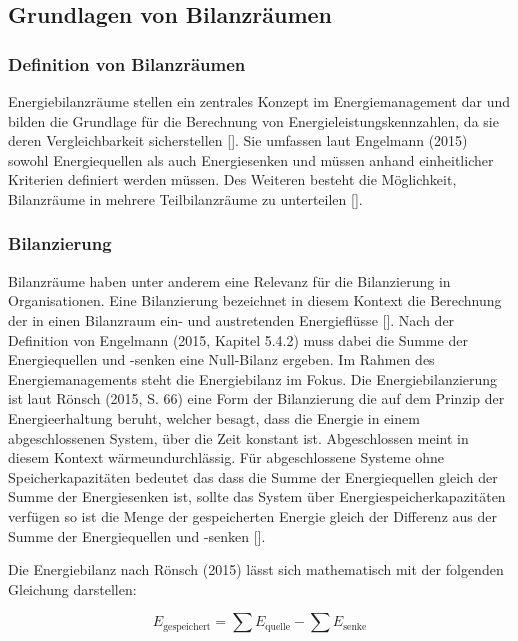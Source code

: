 \subsection{Grundlagen von Bilanzräumen}

\subsubsection{Definition von Bilanzräumen}
Energiebilanzräume stellen ein zentrales Konzept im Energiemanagement dar und bilden die Grundlage für die Berechnung von Energieleistungskennzahlen, da sie deren Vergleichbarkeit sicherstellen [\cite[Kapitel 5.4.2]{Engelmann.2015}]. 
Sie umfassen laut Engelmann (2015) sowohl Energiequellen als auch Energiesenken und müssen anhand einheitlicher Kriterien definiert werden müssen. Des Weiteren besteht die Möglichkeit, 
Bilanzräume in mehrere Teilbilanzräume zu unterteilen [\cite[Kapitel 5.4.2]{Engelmann.2015}].



\subsubsection{Bilanzierung}
Bilanzräume haben unter anderem eine Relevanz für die Bilanzierung in Organisationen. Eine Bilanzierung bezeichnet in diesem Kontext die Berechnung der in einen Bilanzraum ein- und austretenden 
Energieflüsse [\cite[S. 65]{Rönsch.2015}]. Nach der Definition von Engelmann (2015, Kapitel 5.4.2) muss dabei die Summe der Energiequellen und -senken eine Null-Bilanz ergeben. Im Rahmen des Energiemanagements steht 
die Energiebilanz im Fokus. Die Energiebilanzierung ist laut Rönsch (2015, S. 66) eine Form der Bilanzierung die auf dem Prinzip der Energieerhaltung beruht, welcher besagt, dass die Energie in einem abgeschlossenen System, über die Zeit 
konstant ist. Abgeschlossen meint in diesem Kontext wärmeundurchlässig. Für abgeschlossene Systeme ohne Speicherkapazitäten bedeutet das dass die Summe der Energiequellen gleich der Summe der Energiesenken ist, 
sollte das System über Energiespeicherkapazitäten verfügen so ist die Menge der gespeicherten Energie gleich der Differenz aus der Summe der Energiequellen und -senken [\cite{Rönsch.2015}]. 

Die Energiebilanz nach Rönsch (2015) lässt sich mathematisch mit der folgenden Gleichung darstellen:

\[
E_{\text{gespeichert}} = \sum E_{\text{quelle}} - \sum E_{\text{senke}}
\]

